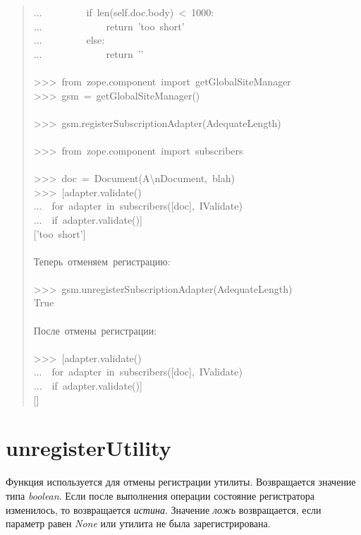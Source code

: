\documentclass[14pt,a4paper,openany,twoside,final]{extbook}
\providecommand*{\DUroletitlereference}[1]{\textsl{#1}}
\begin{document}
\begin{quote}
{...~~~~~~~~~if~len(self.doc.body)~<~1000:\\
...~~~~~~~~~~~~~return~'too~short'\\
...~~~~~~~~~else:\\
...~~~~~~~~~~~~~return~'{}'\\
~\\
>{}>{}>~from~zope.component~import~getGlobalSiteManager\\
>{}>{}>~gsm~=~getGlobalSiteManager()\\
~\\
>{}>{}>~gsm.registerSubscriptionAdapter(AdequateLength)\\
~\\
>{}>{}>~from~zope.component~import~subscribers\\
~\\
>{}>{}>~doc~=~Document(\textquotedbl{}A\textbackslash{}nDocument\textquotedbl{},~\textquotedbl{}blah\textquotedbl{})\\
>{}>{}>~{[}adapter.validate()\\
...~~for~adapter~in~subscribers({[}doc{]},~IValidate)\\
...~~if~adapter.validate(){]}\\
{[}'too~short'{]}\\
~\\
Теперь~отменяем~регистрацию:\\
~\\
>{}>{}>~gsm.unregisterSubscriptionAdapter(AdequateLength)\\
True\\
~\\
После~отмены~регистрации:\\
~\\
>{}>{}>~{[}adapter.validate()\\
...~~for~adapter~in~subscribers({[}doc{]},~IValidate)\\
...~~if~adapter.validate(){]}\\
{[}{]}
}
\end{quote}


\section*{unregisterUtility%
  \label{unregisterutility}%
}

Функция используется для отмены регистрации утилиты.  Возвращается
значение типа \DUroletitlereference{boolean}.  Если после выполнения операции состояние
регистратора изменилось, то возвращается \DUroletitlereference{истина}.  Значение \DUroletitlereference{ложь}
возвращается, если параметр равен \DUroletitlereference{None} или утилита не была
зарегистрирована.
\end{document}

